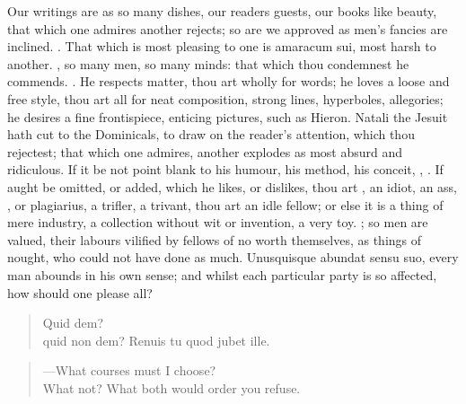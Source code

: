 {Our writings are as so many dishes, our readers guests, our books like
beauty, that which one admires another rejects; so are we approved as
men's fancies are inclined. . That which is most pleasing to one is amaracum sui, most
harsh to another. , so many men, so many
minds: that which thou condemnest he commends. . He respects matter, thou art wholly for
words; he loves a loose and free style, thou art all for neat
composition, strong lines, hyperboles, allegories; he desires a fine
frontispiece, enticing pictures, such as Hieron. Natali the Jesuit
hath cut to the Dominicals, to draw on the reader's attention, which
thou rejectest; that which one admires, another explodes as most absurd
and ridiculous. If it be not point blank to his humour, his method, his
conceit, , \etc. If aught be omitted, or added, which he likes, or
dislikes, thou art , an idiot, an ass, , or plagiarius, a trifler, a trivant, thou art an idle fellow; or
else it is a thing of mere industry, a collection without wit or
invention, a very toy. ; so men are valued, their
labours vilified by fellows of no worth themselves, as things of
nought, who could not have done as much. Unusquisque abundat sensu suo,
every man abounds in his own sense; and whilst each particular party is
so affected, how should one please all?

\begin{verse}
\textlatin{Quid dem?}\\
\textlatin{quid non dem? Renuis tu quod jubet ille.}
\end{verse}

\begin{verse}
---What courses must I choose?\\
What not? What both would order you refuse.
\end{verse}

}
